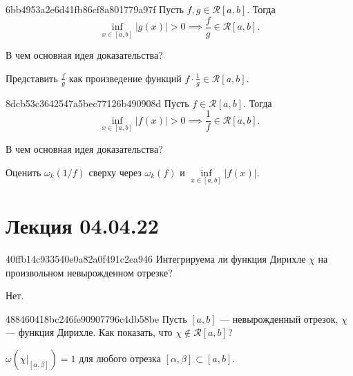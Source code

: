\begin{note}{6bb4953a2e6d41fb86cf8a801779a97f}
    Пусть \({ f, g \in \mathcal R[a, b] }\). Тогда
    \[
        \underset{x \in [a, b]}{\inf} \left\lvert g(x) \right\rvert > 0 \implies \frac{f}{g} \in \mathcal R[a, b].
    \]

    В чем основная идея доказательства?

    \begin{cloze}{1}
        Представить \({ \frac{f}{g} }\) как произведение функций \({ f \cdot \frac{1}{g} \in \mathcal R[a, b] }\).
    \end{cloze}
\end{note}

\begin{note}{8dcb53c3642547a5bec77126b490908d}
    Пусть \({ f \in \mathcal R[a, b] }\). Тогда
    \[
        \underset{x \in [a, b]}{\inf} \left\lvert f(x) \right\rvert > 0 \implies \frac{1}{f} \in \mathcal R[a, b].
    \]

    В чем основная идея доказательства?

    \begin{cloze}{1}
        Оценить \({ \omega_k( 1 / f ) }\) сверху через \({ \omega_k(f) }\) и \({ \underset{x \in [a, b]}{\inf} \left\lvert f(x) \right\rvert     }\).
    \end{cloze}
\end{note}

\section{Лекция 04.04.22}
\begin{note}{40ffb14c933540e0a82a0f491c2ea946}
    Интегрируема ли функция Дирихле \({ \chi }\) на произвольном невырожденном отрезке?

    \begin{cloze}{1}
        Нет.
    \end{cloze}
\end{note}

\begin{note}{488460418bc246fe90907796c4db58be}
    Пусть \({ [a, b]  }\) --- невырожденный отрезок, \({ \chi }\) --- функция Дирихле.
    Как показать, что \({ \chi \not\in \mathcal R[a, b] }\)?

    \begin{cloze}{1}
        \({ \omega(\chi|_{[\alpha, \beta]}) = 1 }\) для любого отрезка \({ [\alpha, \beta] \subset [a, b] }\).
    \end{cloze}
\end{note}

